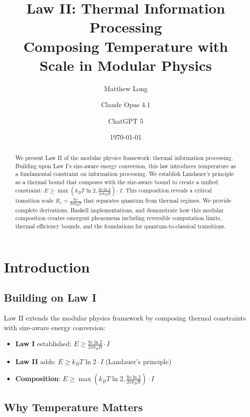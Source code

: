 \documentclass[11pt,a4paper]{article}
\title{Law II: Thermal Information Processing\\[0.5em]
\large Composing Temperature with Scale in Modular Physics}
\author[1]{Matthew Long}
\author[2]{Claude Opus 4.1}
\author[3]{ChatGPT 5}
\affil[1]{YonedaAI}
\affil[2]{Anthropic}
\affil[3]{OpenAI}
\date{\today}
\theoremstyle{definition}
\begin{document}
\maketitle

\begin{abstract}
We present Law II of the modular physics framework: thermal information processing. Building upon Law I's size-aware energy conversion, this law introduces temperature as a fundamental constraint on information processing. We establish Landauer's principle as a thermal bound that composes with the size-aware bound to create a unified constraint: $E \geq \max(k_B T \ln 2, \frac{\hbar c \ln 2}{2\pi k_B R}) \cdot I$. This composition reveals a critical transition scale $R_c = \frac{\hbar c}{2\pi k_B T}$ that separates quantum from thermal regimes. We provide complete derivations, Haskell implementations, and demonstrate how this modular composition creates emergent phenomena including reversible computation limits, thermal efficiency bounds, and the foundations for quantum-to-classical transitions.
\end{abstract}

\tableofcontents

\section{Introduction}

\subsection{Building on Law I}

Law II extends the modular physics framework by composing thermal constraints with size-aware energy conversion:

\begin{itemize}
\item \textbf{Law I} established: $E \geq \frac{\hbar c \ln 2}{2\pi k_B R} \cdot I$
\item \textbf{Law II} adds: $E \geq k_B T \ln 2 \cdot I$ (Landauer's principle)
\item \textbf{Composition}: $E \geq \max\left(k_B T \ln 2, \frac{\hbar c \ln 2}{2\pi k_B R}\right) \cdot I$
\end{itemize}

\subsection{Why Temperature Matters}
\end{document}
